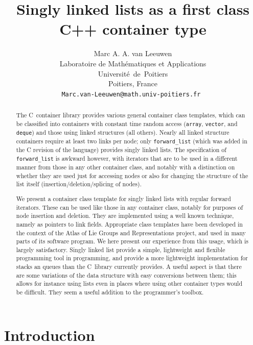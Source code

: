 \documentclass[12pt]{article}
\title{Singly linked lists as a first class C++ container type}
\author{Marc A. A. van Leeuwen\\
\small Laboratoire de Math\'ematiques et Applications\\[-0.8ex]
\small Universit\'e~de~Poitiers\\[-0.8ex]
\small Poitiers, France\\
\small\tt Marc.van-Leeuwen@math.univ-poitiers.fr
}
\theoremstyle{plain}
\theoremstyle{definition}
\def\PP{\copy\PPbox}
\newcommand\Cee{\textsc{C}}
\newcommand\Cpp{\Cee\PP}
\begin{document}
\maketitle

\begin{abstract}
The \Cpp\ container library provides various general container class templates,
which can be classified into containers with constant time random access
(\texttt{array}, \texttt{vector}, and \texttt{deque}) and those using linked
structures (all others). Nearly all linked structure containers require at least
two links per node; only \texttt{forward\_list} (which was added in the \Cpp11
revision of the language) provides singly linked lists. The specification of
\texttt{forward\_list} is awkward however, with iterators that are to
be used in a different manner from those in any other container class, and
notably with a distinction on whether they are used just for accessing nodes or
also for changing the structure of the list itself (insertion/deletion/splicing
of nodes).

We present a container class template for singly linked lists with regular
forward iterators. These can be used like those in any container class, notably
for purposes of node insertion and deletion. They are implemented using a well
known technique, namely as pointers to link fields. Appropriate class
templates have been developed in the context of the Atlas of Lie Groups and
Representations project, and used in many parts of its software program. We here
present our experience from this usage, which is largely satisfactory. Singly
linked list provide a simple, lightweight and flexible programming tool
in programming, and provide a more lightweight implementation for stacks an
queues than the \Cpp~library currently provides. A useful aspect is that there
are some variations of the data structure with easy conversions between them;
this allows for instance using lists even in places where using other container
types would be difficult. They seem a useful addition to the programmer's
toolbox.

\end{abstract}
\maketitle


\section{Introduction}
\end{document}
